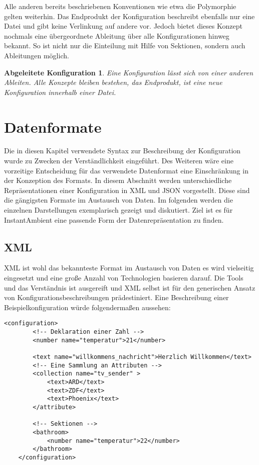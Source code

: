 Alle anderen bereits beschriebenen Konventionen wie etwa die Polymorphie gelten weiterhin. Das Endprodukt der Konfiguration beschreibt ebenfalls nur eine Datei und gibt keine Verlinkung auf andere vor. Jedoch bietet dieses Konzept nochmals eine übergeordnete Ableitung über alle Konfigurationen hinweg bekannt. So ist nicht nur die Einteilung mit Hilfe von Sektionen, sondern auch Ableitungen möglich. 

\newtheorem{mydef}{Abgeleitete Konfiguration}
\begin{mydef}
Eine Konfiguration lässt sich von einer anderen Ableiten. Alle Konzepte bleiben bestehen, das Endprodukt, ist eine neue Konfiguration innerhalb einer Datei. 
\end{mydef}

\section{Datenformate}
Die in diesen Kapitel verwendete Syntax zur Beschreibung der Konfiguration wurde zu Zwecken der Verständlichkeit eingeführt. Des Weiteren wäre eine vorzeitige Entscheidung für das verwendete Datenformat eine Einschränkung in der Konzeption des Formats. In diesem Abschnitt werden unterschiedliche Repräsentationen einer Konfiguration in XML und JSON vorgestellt. Diese sind die gängigsten Formate im Austausch von Daten. Im folgenden werden die einzelnen Darstellungen exemplarisch gezeigt und diskutiert. Ziel ist es für InstantAmbient eine passende Form der Datenrepräsentation zu finden. 

\subsection{XML}
XML ist wohl das bekannteste Format im Austausch von Daten es wird vielseitig eingesetzt und eine große Anzahl von Technologien basieren darauf. Die Tools und das Verständnis ist ausgereift und XML selbst ist für den generischen Ansatz von Konfigurationsbeschreibungen prädestiniert. Eine Beschreibung einer Beispielkonfiguration würde folgendermaßen aussehen: 

\lstset{language=XML}
\begin{lstlisting}[caption=XML-Konfiguration, captionpos=b]
	<configuration>
		<!-- Deklaration einer Zahl -->
		<number name="temperatur">21</number>
		
		<text name="willkommens_nachricht">Herzlich Willkommen</text>
		<!-- Eine Sammlung an Attributen -->
		<collection name="tv_sender" >
			<text>ARD</text>
			<text>ZDF</text>
			<text>Phoenix</text>
		</attribute>

		<!-- Sektionen -->
		<bathroom>
			<number name="temperatur">22</number>
		</bathroom>
	</configuration>
\end{lstlisting}

